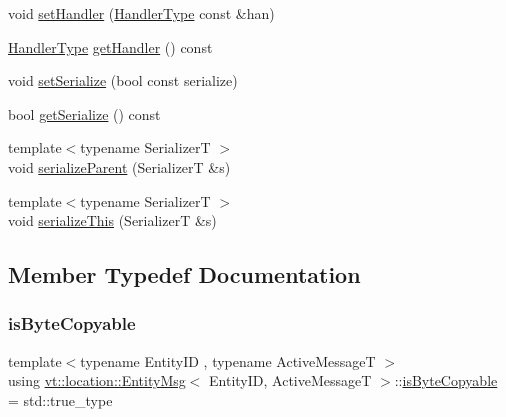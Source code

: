 \begin{DoxyCompactItemize}
\item 
void \hyperlink{structvt_1_1location_1_1_entity_msg_a343ec9990f43b1f2e0bf6b883e7ae507}{set\+Handler} (\hyperlink{namespacevt_af64846b57dfcaf104da3ef6967917573}{Handler\+Type} const \&han)
\item 
\hyperlink{namespacevt_af64846b57dfcaf104da3ef6967917573}{Handler\+Type} \hyperlink{structvt_1_1location_1_1_entity_msg_ab373f1520ac7374900bbea1026372b8e}{get\+Handler} () const
\item 
void \hyperlink{structvt_1_1location_1_1_entity_msg_ae44ee6e75fa015eb0c92ca0b5c595fa8}{set\+Serialize} (bool const serialize)
\item 
bool \hyperlink{structvt_1_1location_1_1_entity_msg_a0dc24a126251cb00a1e44b19eeb9208e}{get\+Serialize} () const
\item 
{\footnotesize template$<$typename SerializerT $>$ }\\void \hyperlink{structvt_1_1location_1_1_entity_msg_a23806941ba21a109c026a48a8da6bc68}{serialize\+Parent} (SerializerT \&s)
\item 
{\footnotesize template$<$typename SerializerT $>$ }\\void \hyperlink{structvt_1_1location_1_1_entity_msg_aeaf0c3e40cef05fa95a24d2cf9525dd1}{serialize\+This} (SerializerT \&s)
\end{DoxyCompactItemize}


\subsection{Member Typedef Documentation}
\mbox{\label{structvt_1_1location_1_1_entity_msg_a480dca0919780108c842bcb113bb28b1}} 
\subsubsection{\texorpdfstring{is\+Byte\+Copyable}{isByteCopyable}}
{\footnotesize\ttfamily template$<$typename Entity\+ID , typename Active\+MessageT $>$ \\
using \hyperlink{structvt_1_1location_1_1_entity_msg}{vt\+::location\+::\+Entity\+Msg}$<$ Entity\+ID, Active\+MessageT $>$\+::\hyperlink{structvt_1_1location_1_1_entity_msg_a480dca0919780108c842bcb113bb28b1}{is\+Byte\+Copyable} =  std\+::true\+\_\+type}



